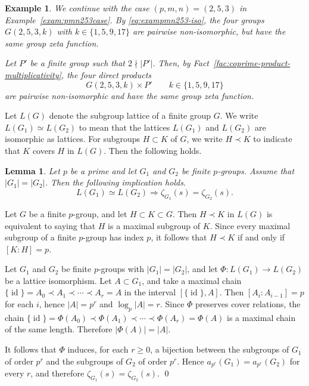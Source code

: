 \documentclass[onecolumn]{article}
\makeatletter
\numberwithin{equation}{section}
\theoremstyle{mytheoremstyle}
\newtheorem{exam}[thm]{Example}
\newtheorem{lem}[thm]{Lemma}
\renewenvironment{proof}[1][\proofname]{%
  \par\normalfont 
  \topsep6pt\relax 
  \trivlist\item[\hskip\labelsep\itshape #1\@addpunct{.}]\ignorespaces
}{%
  \qed\endtrivlist\@endpefalse
}
\DeclareMathOperator{\id}{\mathrm{id}}
\makeatother
\begin{document}
\begin{exam}\label{exam:pmn253-product-extension}
We continue with the case $(p,m,n)=(2,5,3)$ in Example~\ref{exam:pmn253case}.
By \eqref{eq:exampmn253-iso}, the four groups $G(2,5,3,k)$ with
$k\in\{1,5,9,17\}$ are pairwise non-isomorphic, but have the same group zeta function.

Let $P'$ be a finite group such that $2\nmid |P'|$.
Then, by Fact~\ref{fac:coprime-product-multiplicativity}, the four direct products
\[
  G(2,5,3,k)\times P'\qquad k\in\{1,5,9,17\}
\]
are pairwise non-isomorphic and have the same group zeta function.
\end{exam}



Let $L(G)$ denote the subgroup lattice of a finite group $G$.
We write $L(G_{1})\simeq L(G_{2})$ to mean that the lattices $L(G_{1})$ and $L(G_{2})$
are isomorphic as lattices.
For subgroups $H\subset K$ of $G$, we write $H\prec K$ to indicate that $K$ covers $H$ in $L(G)$.
Then the following holds.

\begin{lem}\label{lem:p-group-lattice-iso-implies-zeta}
Let $p$ be a prime and let $G_{1}$ and $G_{2}$ be finite $p$-groups.
Assume that $|G_{1}|=|G_{2}|$.
Then the following implication holds.
\[
  L(G_{1})\simeq L(G_{2}) \Longrightarrow \zeta_{G_{1}}(s) = \zeta_{G_{2}}(s).
\]
\end{lem}

\begin{proof}
Let $G$ be a finite $p$-group, and let $H\subset K\subset G$.
Then $H\prec K$ in $L(G)$ is equivalent to saying that $H$ is a maximal subgroup of $K$.
Since every maximal subgroup of a finite $p$-group has index $p$, it follows that
$H\prec K$ if and only if $[K:H]=p$.

Let $G_{1}$ and $G_{2}$ be finite $p$-groups with $|G_{1}|=|G_{2}|$,
and let $\Phi\colon L(G_{1})\to L(G_{2})$ be a lattice isomorphism.
Let $A\subset G_{1}$, and take a maximal chain $\{\id\}=A_{0}\prec A_{1}\prec \dotsb \prec A_{r}=A$
in the interval $[\{\id\},A]$.
Then $[A_{i}:A_{i-1}]=p$ for each $i$, hence $|A|=p^{r}$ and $\log_{p}|A|=r$.
Since $\Phi$ preserves cover relations, the chain
$\{\id\}=\Phi(A_{0})\prec \Phi(A_{1})\prec \dotsb \prec \Phi(A_{r})=\Phi(A)$
is a maximal chain of the same length.
Therefore $|\Phi(A)|=|A|$.

It follows that $\Phi$ induces, for each $r\ge 0$, a bijection between the subgroups of $G_{1}$
of order $p^{r}$ and the subgroups of $G_{2}$ of order $p^{r}$.
Hence $a_{p^{r}}(G_{1})=a_{p^{r}}(G_{2})$ for every $r$, and therefore
$\zeta_{G_{1}}(s)=\zeta_{G_{2}}(s)$.
\end{proof}
\end{document}
